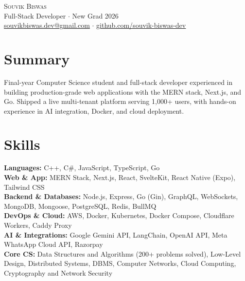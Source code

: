 \documentclass[letterpaper,11pt]{article}
\begin{document}
\begin{center}
    {\Huge \scshape Souvik Biswas} \\ \vspace{3pt}
    \small
    Full-Stack Developer $\cdot$ New Grad 2026 \\ \vspace{2pt}
    \href{mailto:souvikbiswas.dev@gmail.com}{\underline{souvikbiswas.dev@gmail.com}} $\cdot$
    \href{https://github.com/souvik-biswas-dev}{\underline{github.com/souvik-biswas-dev}}
\end{center}

\section{Summary}
\small{Final-year Computer Science student and full-stack developer experienced in building production-grade web applications with the MERN stack, Next.js, and Go. Shipped a live multi-tenant platform serving 1,000+ users, with hands-on experience in AI integration, Docker, and cloud deployment.}
\vspace{-4pt}

\section{Skills}
 \begin{itemize}[leftmargin=0.15in, label={}]
    \small{\item{
     \textbf{Languages:} C++, C\#, JavaScript, TypeScript, Go \\ \vspace{2pt}
     \textbf{Web \& App:} MERN Stack, Next.js, React, SvelteKit, React Native (Expo), Tailwind CSS \\ \vspace{2pt}
     \textbf{Backend \& Databases:} Node.js, Express, Go (Gin), GraphQL, WebSockets, MongoDB, Mongoose, PostgreSQL, Redis, BullMQ \\ \vspace{2pt}
     \textbf{DevOps \& Cloud:} AWS, Docker, Kubernetes, Docker Compose, Cloudflare Workers, Caddy Proxy \\ \vspace{2pt}
     \textbf{AI \& Integrations:} Google Gemini API, LangChain, OpenAI API, Meta WhatsApp Cloud API, Razorpay \\ \vspace{2pt}
     \textbf{Core CS:} Data Structures and Algorithms (200+ problems solved), Low-Level Design, Distributed Systems, DBMS, Computer Networks, Cloud Computing, Cryptography and Network Security
    }}
 \end{itemize}
\end{document}
